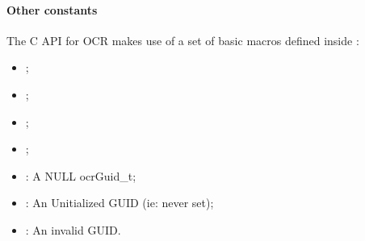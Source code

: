 \paragraph*{Other constants}
The C API for OCR makes use of a set of basic macros defined
inside :
\begin{itemize}
\item {};
\item {};
\item {};
\item {};
\item {}: A NULL ocrGuid\_t;
\item {}: An Unitialized GUID (ie: never set);
\item {}: An invalid GUID.
\end{itemize}
